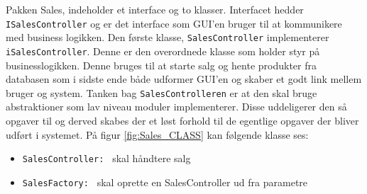 
\newpage Pakken Sales, indeholder et interface og to klasser. Interfacet hedder \texttt{ISalesController} og er det interface som GUI'en bruger til at kommunikere med business logikken.
Den første klasse, \texttt{SalesController} implementerer \texttt{iSalesController}. Denne er den overordnede klasse som holder styr på businesslogikken. Denne bruges til at starte salg og hente produkter fra databasen som i sidste ende både udformer GUI'en og skaber et godt link mellem bruger og system. Tanken bag \texttt{SalesControlleren} er at den skal bruge abstraktioner som lav niveau moduler implementerer. Disse uddeligerer den så opgaver til og derved skabes der et løst forhold til de egentlige opgaver der bliver udført i systemet. På figur \ref{fig:Sales_CLASS} kan følgende klasse ses:

\begin{itemize}
	\item \texttt{SalesController: } skal håndtere salg
	\item \texttt{SalesFactory: } skal oprette en SalesController ud fra parametre
\end{itemize}